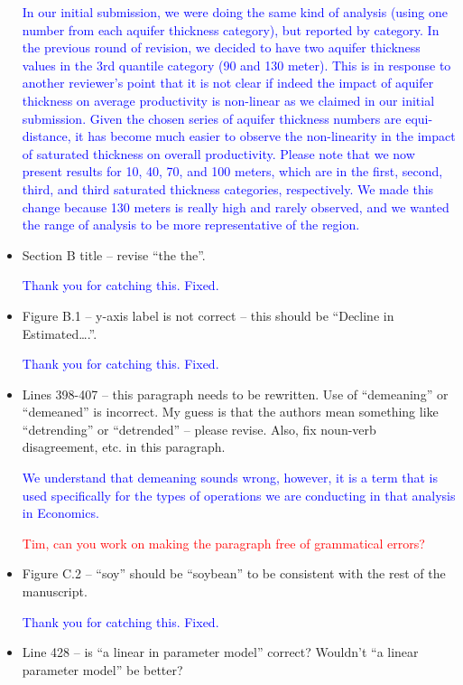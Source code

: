 \documentclass[
]{article}
\begin{document}
\begin{itemize}
\textcolor{blue}{
In our initial submission, we were doing the same kind of analysis (using one number from each aquifer thickness category), but reported by category. In the previous round of revision, we decided to have two aquifer thickness values in the 3rd quantile category (90 and 130 meter). This is in response to another reviewer's point that it is not clear if indeed the impact of aquifer thickness on average productivity is non-linear as we claimed in our initial submission. Given the chosen series of aquifer thickness numbers are equi-distance, it has become much easier to observe the non-linearity in the impact of saturated thickness on overall productivity. Please note that we now present results for 10, 40, 70, and 100 meters, which are in the first, second, third, and third saturated thickness categories, respectively. We made this change because 130 meters is really high and rarely observed, and we wanted the range of analysis to be more representative of the region.}

\item Section B title – revise ``the the''.

\textcolor{blue}{Thank you for catching this. Fixed.}

\item Figure B.1 – y-axis label is not correct – this should be ``Decline in Estimated….''.

\textcolor{blue}{Thank you for catching this. Fixed.}

\item Lines 398-407 – this paragraph needs to be rewritten. Use of ``demeaning'' or ``demeaned'' is incorrect. My guess is that the authors mean something like ``detrending'' or ``detrended'' – please revise. Also, fix noun-verb disagreement, etc. in this paragraph.

\textcolor{blue}{We understand that demeaning sounds wrong, however, it is a term that is used specifically for the types of operations we are conducting in that analysis in Economics.}

\textcolor{red}{Tim, can you work on making the paragraph free of grammatical errors?}

\item Figure C.2 – ``soy'' should be ``soybean'' to be consistent with the rest of the manuscript.

\textcolor{blue}{Thank you for catching this. Fixed.}

\item Line 428 – is ``a linear in parameter model'' correct? Wouldn't ``a linear parameter model'' be better?


\end{itemize}
\end{document}
